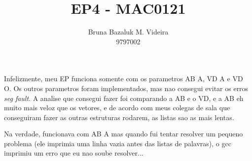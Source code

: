 \documentclass[12pt]{article}
\begin{document}
 
 
\title{EP4 - MAC0121}
\author{Bruna Bazaluk M. Videira \\ 9797002}
\maketitle
 
Infelizmente, meu EP funciona somente com os parametros AB A, VD A e VD O. Os outros parametros foram implementados, mas nao consegui evitar os erros \textit{seg fault}.
A analise que consegui fazer foi comparando a AB e o VD, e a AB eh muito mais veloz que os vetores, e de acordo com meus colegas de sala que conseguiram fazer as outras estruturas rodarem, as listas sao as mais lentas.

Na verdade, funcionava com AB A mas quando fui tentar resolver um pequeno problema (ele imprimia uma linha vazia antes das listas de palavras), o gcc imprimiu um erro que eu nao soube resolver...
\end{document}

